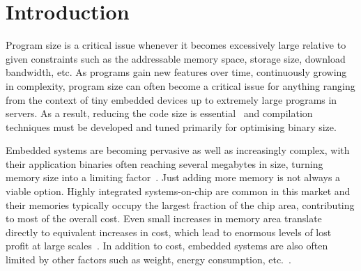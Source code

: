 
\chapter{Introduction}

Program size is a critical issue whenever it becomes excessively large relative to given constraints such as the addressable memory space, storage size, download bandwidth, etc.
As programs gain new features over time, continuously growing in complexity, program size can often become a critical issue for anything ranging from the context of tiny embedded devices up to extremely large programs in servers.
As a result, reducing the code size is essential~\cite{schultz03,varma04,sehgal12,keoh14,auler17} and compilation techniques must be developed and tuned primarily for optimising binary size.




Embedded systems are becoming pervasive as well as increasingly complex, with their application binaries often reaching several megabytes in size, turning memory size into a limiting factor~\cite{plaza18}.
Just adding more memory is not always a viable option.
Highly integrated systems-on-chip are common in this market and their memories typically occupy the largest fraction of the chip area, contributing to most of the overall cost.
Even small increases in memory area translate directly to equivalent increases in cost, which lead to enormous levels of lost profit at large scales~\cite{edler10}.
In addition to cost, embedded systems are also often limited by other factors such as weight, energy consumption, etc.~\cite{tiggeler00,edwards20}.

